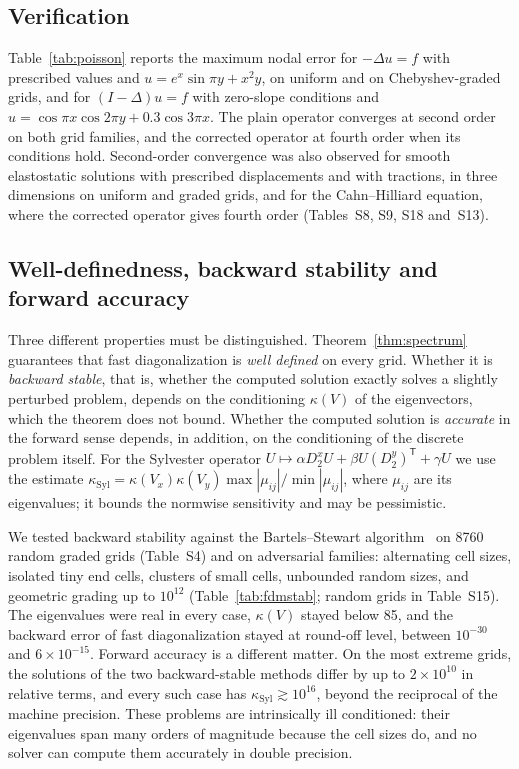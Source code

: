 \documentclass[smallextended,envcountsame]{svjour3}
\begin{document}
\subsection{Verification}\label{sec:verify}
Table~\ref{tab:poisson} reports the maximum nodal error for $-\Delta u=f$ with prescribed values and
$u=e^x\sin\pi y+x^2y$, on uniform and on Chebyshev-graded grids, and for $(I-\Delta)u=f$ with zero-slope
conditions and $u=\cos\pi x\cos2\pi y+0.3\cos3\pi x$. The plain operator converges at second order on both
grid families, and the corrected operator at fourth order when its conditions hold. Second-order
convergence was also observed for smooth elastostatic solutions with prescribed displacements and with
tractions, in three dimensions on uniform and graded grids, and for the Cahn--Hilliard equation, where the
corrected operator gives fourth order (Tables~S8, S9, S18 and~S13).

\begin{table}[t]\centering\footnotesize
\caption{Maximum nodal error and observed convergence rates for two model problems.}\label{tab:poisson}

\end{table}

\subsection{Well-definedness, backward stability and forward accuracy}\label{sec:robust}
Three different properties must be distinguished. Theorem~\ref{thm:spectrum} guarantees that fast
diagonalization is \emph{well defined} on every grid. Whether it is \emph{backward stable}, that is, whether
the computed solution exactly solves a slightly perturbed problem, depends on the conditioning $\kappa(V)$ of
the eigenvectors, which the theorem does not bound. Whether the computed solution is \emph{accurate} in the
forward sense depends, in addition, on the conditioning of the discrete problem itself. For the Sylvester
operator $U\mapsto\alpha D_2^xU+\beta U(D_2^y)^{\mathsf T}+\gamma U$ we use the estimate
$\kappa_{\mathrm{Syl}}=\kappa(V_x)\kappa(V_y)\max|\mu_{ij}|/\min|\mu_{ij}|$, where $\mu_{ij}$ are its
eigenvalues; it bounds the normwise sensitivity and may be pessimistic.

We tested backward stability against the Bartels--Stewart algorithm~\cite{bartels1972solution} on 8760 random
graded grids (Table~S4) and on adversarial families: alternating cell sizes, isolated tiny end cells,
clusters of small cells, unbounded random sizes, and geometric grading up to $10^{12}$
(Table~\ref{tab:fdmstab}; random grids in Table~S15). The eigenvalues were real in every case, $\kappa(V)$
stayed below 85, and the backward error of fast diagonalization stayed at round-off level, between
$10^{-30}$ and $6\times10^{-15}$. Forward accuracy is a different matter. On the most extreme grids, the
solutions of the two backward-stable methods differ by up to $2\times10^{10}$ in relative terms, and every
such case has $\kappa_{\mathrm{Syl}}\gtrsim10^{16}$, beyond the reciprocal of the machine precision. These
problems are intrinsically ill conditioned: their eigenvalues span many orders of magnitude because the cell
sizes do, and no solver can compute them accurately in double precision.
\end{document}
